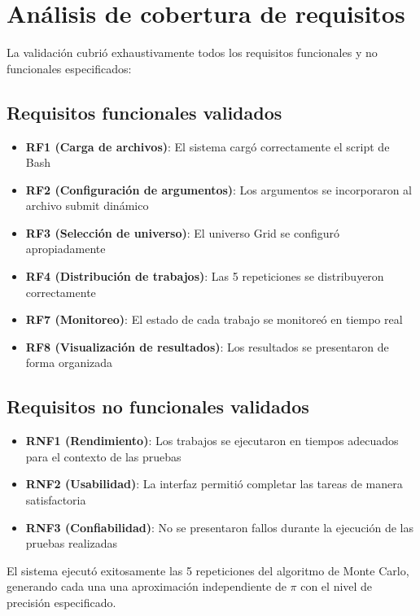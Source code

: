 \section{Análisis de cobertura de requisitos}
\noindent

La validación cubrió exhaustivamente todos los requisitos funcionales y no funcionales especificados:

\subsection{Requisitos funcionales validados}
\noindent

\begin{itemize}
	\item \textbf{RF1 (Carga de archivos)}: El sistema cargó correctamente el script de Bash
	\item \textbf{RF2 (Configuración de argumentos)}: Los argumentos se incorporaron al archivo submit dinámico
	\item \textbf{RF3 (Selección de universo)}: El universo Grid se configuró apropiadamente
	\item \textbf{RF4 (Distribución de trabajos)}: Las 5 repeticiones se distribuyeron correctamente
	\item \textbf{RF7 (Monitoreo)}: El estado de cada trabajo se monitoreó en tiempo real
	\item \textbf{RF8 (Visualización de resultados)}: Los resultados se presentaron de forma organizada
\end{itemize}

\subsection{Requisitos no funcionales validados}
\noindent

\begin{itemize}
	\item \textbf{RNF1 (Rendimiento)}: Los trabajos se ejecutaron en tiempos adecuados para el contexto de las pruebas
	\item \textbf{RNF2 (Usabilidad)}: La interfaz permitió completar las tareas de manera satisfactoria
	\item \textbf{RNF3 (Confiabilidad)}: No se presentaron fallos durante la ejecución de las pruebas realizadas
\end{itemize}

El sistema ejecutó exitosamente las 5 repeticiones del algoritmo de Monte Carlo, generando cada una una aproximación independiente de $\pi$ con el nivel de precisión especificado.

